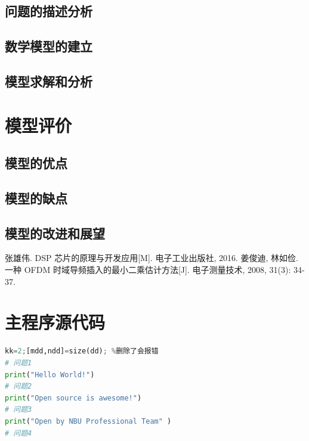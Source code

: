\documentclass[a4paper,10pt]{my_paper}
\numberwithin{equation}{section}
\begin{document}
\subsection{问题的描述分析}

\subsection{数学模型的建立}

\subsection{模型求解和分析}

\section{模型评价}

\subsection{模型的优点}

\subsection{模型的缺点}

\subsection{模型的改进和展望}

\begin{thebibliography}{10}
张雄伟. DSP 芯片的原理与开发应用[M]. 电子工业出版社, 2016.
姜俊迪, 林如俭. 一种 OFDM 时域导频插入的最小二乘估计方法[J]. 电子测量技术, 2008, 31(3): 34-37.

\end{thebibliography}

\newpage

\appendix

\section{主程序源代码}

\begin{lstlisting}[language=Python]%设置不同语言即可。
kk=2;[mdd,ndd]=size(dd); %删除了会报错
# 问题1
print("Hello World!")
# 问题2
print("Open source is awesome!")
# 问题3
print("Open by NBU Professional Team" )
# 问题4

\end{lstlisting}
\end{document}
